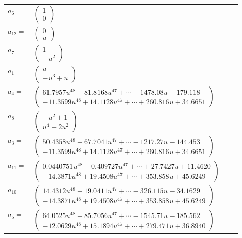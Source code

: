 \documentclass[1p]{elsarticle_modified}
\theoremstyle{definition}
\begin{document}
\begin{tabular}{m{7pt} m{180pt} m{7pt} m{180pt} }
\flushright $a_{6}=$&$\begin{pmatrix}1\\0\end{pmatrix}$ \\
\flushright $a_{12}=$&$\begin{pmatrix}0\\u\end{pmatrix}$ \\
\flushright $a_{7}=$&$\begin{pmatrix}1\\- u^2\end{pmatrix}$ \\
\flushright $a_{1}=$&$\begin{pmatrix}u\\- u^3+u\end{pmatrix}$ \\
\flushright $a_{4}=$&$\begin{pmatrix}61.7957 u^{48}-81.8168 u^{47}+\cdots-1478.08 u-179.118\\-11.3599 u^{48}+14.1128 u^{47}+\cdots+260.816 u+34.6651\end{pmatrix}$ \\
\flushright $a_{8}=$&$\begin{pmatrix}- u^2+1\\u^4-2 u^2\end{pmatrix}$ \\
\flushright $a_{3}=$&$\begin{pmatrix}50.4358 u^{48}-67.7041 u^{47}+\cdots-1217.27 u-144.453\\-11.3599 u^{48}+14.1128 u^{47}+\cdots+260.816 u+34.6651\end{pmatrix}$ \\
\flushright $a_{11}=$&$\begin{pmatrix}0.0440751 u^{48}+0.409727 u^{47}+\cdots+27.7427 u+11.4620\\-14.3871 u^{48}+19.4508 u^{47}+\cdots+353.858 u+45.6249\end{pmatrix}$ \\
\flushright $a_{10}=$&$\begin{pmatrix}14.4312 u^{48}-19.0411 u^{47}+\cdots-326.115 u-34.1629\\-14.3871 u^{48}+19.4508 u^{47}+\cdots+353.858 u+45.6249\end{pmatrix}$ \\
\flushright $a_{5}=$&$\begin{pmatrix}64.0525 u^{48}-85.7056 u^{47}+\cdots-1545.71 u-185.562\\-12.0629 u^{48}+15.1894 u^{47}+\cdots+279.471 u+36.8940\end{pmatrix}$ \\

\end{tabular}
\end{document}
